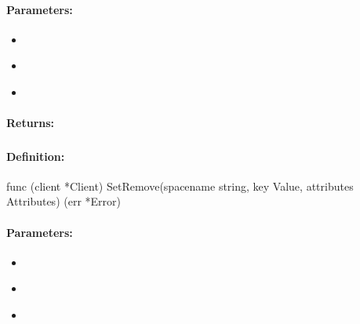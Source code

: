 \paragraph{Parameters:}
\begin{itemize}[noitemsep]
\item {}\\

\item {}\\

\item {}\\

\end{itemize}

\paragraph{Returns:}


\pagebreak
\subsubsection{}
\label{api:Go:SetRemove}


\paragraph{Definition:}
\begin{gocode}
func (client *Client) SetRemove(spacename string, key Value, attributes Attributes) (err *Error)
\end{gocode}

\paragraph{Parameters:}
\begin{itemize}[noitemsep]
\item {}\\

\item {}\\

\item {}\\

\end{itemize}

